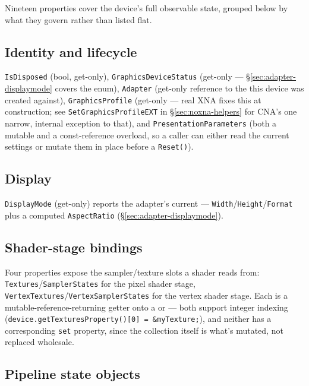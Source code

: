 Nineteen properties cover the device's full observable state, grouped below by what they
govern rather than listed flat.

\subsection{Identity and lifecycle}

\texttt{IsDisposed} (bool, get-only), \texttt{GraphicsDeviceStatus} (get-only ---
\S\ref{sec:adapter-displaymode} covers the enum), \texttt{Adapter} (get-only reference to the
 this device was created against), \texttt{GraphicsProfile} (get-only
--- real XNA fixes this at construction; see \texttt{SetGraphicsProfileEXT} in
\S\ref{sec:noxna-helpers} for CNA's one narrow, internal exception to that), and
\texttt{PresentationParameters} (both a mutable and a const-reference overload, so a caller can
either read the current settings or mutate them in place before a \texttt{Reset()}).

\subsection{Display}

\texttt{DisplayMode} (get-only) reports the adapter's current  ---
\texttt{Width}/\texttt{Height}/\texttt{Format} plus a computed \texttt{AspectRatio}
(\S\ref{sec:adapter-displaymode}).

\subsection{Shader-stage bindings}

Four properties expose the sampler/texture slots a shader reads from:
\texttt{Textures}/\texttt{SamplerStates} for the pixel shader stage,
\texttt{VertexTextures}/\texttt{VertexSamplerStates} for the vertex shader stage. Each is a
mutable-reference-returning getter onto a  or
 --- both support integer indexing
(\texttt{device.getTexturesProperty()[0] = \&myTexture;}), and neither has a corresponding
\texttt{set} property, since the collection itself is what's mutated, not replaced wholesale.

\subsection{Pipeline state objects}

